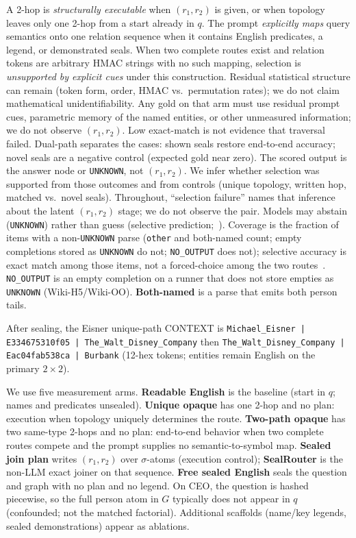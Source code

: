 \documentclass{article}
\begin{document}
A 2-hop is \emph{structurally executable} when $(r_1,r_2)$ is given, or when
topology leaves only one 2-hop from a start already in $q$. The prompt
\emph{explicitly maps} query semantics onto one relation sequence when it
contains English predicates, a legend, or demonstrated seals.
When two complete routes exist and relation tokens are arbitrary HMAC strings
with no such mapping, selection is \emph{unsupported by explicit cues}
under this construction.
Residual statistical structure can remain (token form, order, HMAC vs.\
permutation rates); we do not claim mathematical unidentifiability.
Any gold on that arm must use residual prompt cues, parametric memory of
the named entities, or other unmeasured information; we do not observe
$(r_1,r_2)$.
Low exact-match is not evidence that traversal failed.
Dual-path separates the cases: shown seals restore end-to-end accuracy;
novel seals are a negative control (expected gold near zero).
The scored output is the answer node or \texttt{UNKNOWN}, not $(r_1,r_2)$.
We infer whether selection was supported from those outcomes and from
controls (unique topology, written hop, matched vs.\ novel seals).
Throughout, ``selection failure'' names that inference about the latent
$(r_1,r_2)$ stage; we do not observe the pair.
Models may abstain (\texttt{UNKNOWN}) rather than guess
(selective prediction;~\citealp{elyaniv2010selective,geifman2017selective}).
Coverage is the fraction of items with a non-\texttt{UNKNOWN} parse
(\texttt{other} and both-named count; empty completions stored as
\texttt{UNKNOWN} do not; \texttt{NO\_OUTPUT} does not);
selective accuracy is exact match among those items, not a forced-choice
among the two routes~\citep{elyaniv2010selective,wen2025abstention}.
\texttt{NO\_OUTPUT} is an empty completion on a runner that does not store
empties as \texttt{UNKNOWN} (Wiki-H5/Wiki-OO).
\textbf{Both-named} is a parse that emits both person tails.

After sealing, the Eisner unique-path CONTEXT is
\texttt{Michael\_Eisner | E334675310f05 | The\_Walt\_Disney\_Company} then
\texttt{The\_Walt\_Disney\_Company | Eac04fab538ca | Burbank}
(12-hex tokens; entities remain English on the primary $2{\times}2$).

We use five measurement arms.
\textbf{Readable English} is the baseline (start in $q$; names and
predicates unsealed).
\textbf{Unique opaque} has one 2-hop and no plan: execution when topology
uniquely determines the route.
\textbf{Two-path opaque} has two same-type 2-hops and no plan: end-to-end
behavior when two complete routes compete and the prompt supplies no
semantic-to-symbol map.
\textbf{Sealed join plan} writes $(r_1,r_2)$ over $\sigma$-atoms (execution
control); \textbf{SealRouter} is the non-LLM exact joiner on that sequence.
\textbf{Free sealed English} seals the question and graph with no plan and
no legend. On CEO, the question is hashed piecewise, so the full person atom
in $G$ typically does not appear in $q$ (confounded; not the matched
factorial).
Additional scaffolds (name/key legends, sealed demonstrations) appear as
ablations.
\end{document}

